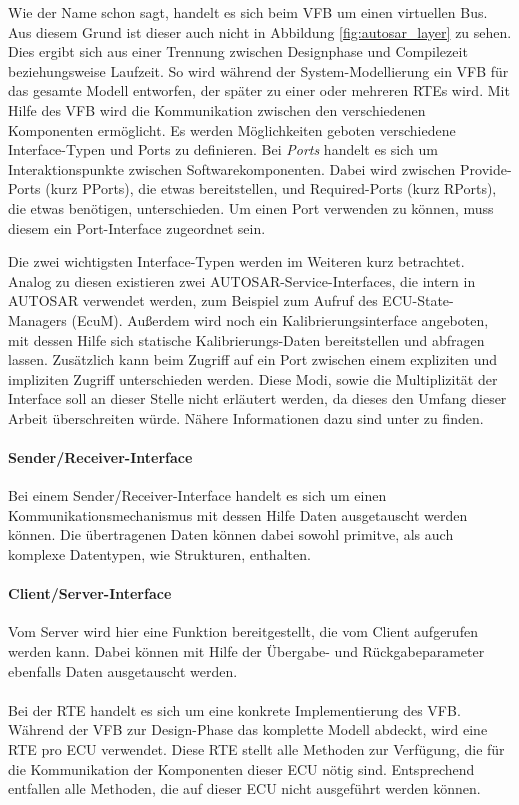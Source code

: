 \documentclass[
  a4paper,					    %
  twoside,
  DIV=calc,     				%
  bibliography=totoc,
  cleardoublepage=empty,
  ngerman,     					%
  final       					%
]{scrbook}
\begin{document}
Wie der Name schon sagt, handelt es sich beim VFB um einen virtuellen Bus. Aus diesem Grund ist dieser auch nicht in Abbildung \ref{fig:autosar_layer} zu sehen. Dies ergibt sich aus einer Trennung zwischen Designphase und Compilezeit beziehungsweise Laufzeit. So wird während der System-Modellierung ein VFB für das gesamte Modell entworfen, der später zu einer oder mehreren RTEs wird. Mit Hilfe des VFB wird die Kommunikation zwischen den verschiedenen Komponenten ermöglicht. Es werden Möglichkeiten geboten verschiedene Interface-Typen und Ports zu definieren. Bei \emph{Ports} handelt es sich um Interaktionspunkte zwischen Softwarekomponenten. Dabei wird zwischen Provide-Ports (kurz PPorts), die etwas bereitstellen, und Required-Ports (kurz RPorts), die etwas benötigen, unterschieden. Um einen Port verwenden zu können, muss diesem ein Port-Interface zugeordnet sein.

Die zwei wichtigsten Interface-Typen werden im Weiteren kurz betrachtet. Analog zu diesen existieren zwei AUTOSAR-Service-Interfaces, die intern in AUTOSAR verwendet werden, zum Beispiel zum Aufruf des ECU-State-Managers (EcuM). Außerdem wird noch ein Kalibrierungsinterface angeboten, mit dessen Hilfe sich statische Kalibrierungs-Daten bereitstellen und abfragen lassen. Zusätzlich kann beim Zugriff auf ein Port zwischen einem expliziten und impliziten Zugriff unterschieden werden. Diese Modi, sowie die Multiplizität der Interface soll an dieser Stelle nicht erläutert werden, da dieses den Umfang dieser Arbeit überschreiten würde. Nähere Informationen dazu sind unter \cite[Seite 101 ff.]{SE_Autosar} zu finden.

\paragraph{Sender/Receiver-Interface}
Bei einem Sender/Receiver-Interface handelt es sich um einen Kommunikationsmechanismus mit dessen Hilfe Daten ausgetauscht werden können. Die übertragenen Daten können dabei sowohl primitve, als auch komplexe Datentypen, wie Strukturen, enthalten.

\paragraph{Client/Server-Interface}
Vom Server wird hier eine Funktion bereitgestellt, die vom Client aufgerufen werden kann. Dabei können mit Hilfe der Übergabe- und Rückgabeparameter ebenfalls Daten ausgetauscht werden.

\paragraph*{}
Bei der RTE handelt es sich um eine konkrete Implementierung des VFB. Während der VFB zur Design-Phase das komplette Modell abdeckt, wird eine RTE pro ECU verwendet. Diese RTE stellt alle Methoden zur Verfügung, die für die Kommunikation der Komponenten dieser ECU nötig sind. Entsprechend entfallen alle Methoden, die auf dieser ECU nicht ausgeführt werden können.
\end{document}
